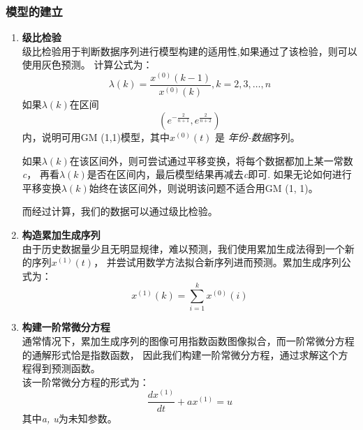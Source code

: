 \documentclass[a4paper, 12pt]{article}
\numberwithin{equation}{section}
\begin{document}
                \subsubsection{模型的建立}
                    \begin{enumerate}
                        \item \textbf{级比检验} \\
                            级比检验用于判断数据序列进行模型构建的适用性,如果通过了该检验，则可以使用灰色预测。
                            计算公式为：
                            \begin{equation}
                                \lambda (k) = \frac{x^{ (0)} (k - 1)}{x^{ (0)} (k)}, k = 2, 3, \ldots, n
                            \end{equation}
                            如果$ \lambda (k) $在区间
                            \[ (e^{-\frac{2}{n + 1}}, e^{\frac{2}{n + 2}}) \]
                            内，说明可用GM (1,1)模型，其中$ x^{ (0)} (t) $ 是 \textit{年份-数据}序列。

                            如果$ \lambda (k) $在该区间外，则可尝试通过平移变换，将每个数据都加上某一常数\textit{c}，
                            再看$ \lambda (k) $是否在区间内，最后模型结果再减去\textit{c}即可.
                            如果无论如何进行平移变换$ \lambda (k) $始终在该区间外，则说明该问题不适合用GM (1, 1)。

                            而经过计算，我们的数据可以通过级比检验。

                        \item \textbf{构造累加生成序列} \\
                            由于历史数据量少且无明显规律，难以预测，我们使用累加生成法得到一个新的序列$ x^{ (1)} (t) $，
                            并尝试用数学方法拟合新序列进而预测。累加生成序列公式为：
                            \begin{equation}
                                x^{ (1)} (k) = \sum_{i=1}^{k} x^{ (0)} (i)
                            \end{equation}

                        \item \textbf{构建一阶常微分方程} \\
                            通常情况下，累加生成序列的图像可用指数函数图像拟合，而一阶常微分方程的通解形式恰是指数函数，
                            因此我们构建一阶常微分方程，通过求解这个方程得到预测函数。 \\
                            该一阶常微分方程的形式为：
                            \begin{equation}
                                \frac{dx^{ (1)}}{dt} + ax^{ (1)} = u
                            \end{equation}
                            其中\textit{a, u}为未知参数。
                    \end{enumerate}
\end{document}
